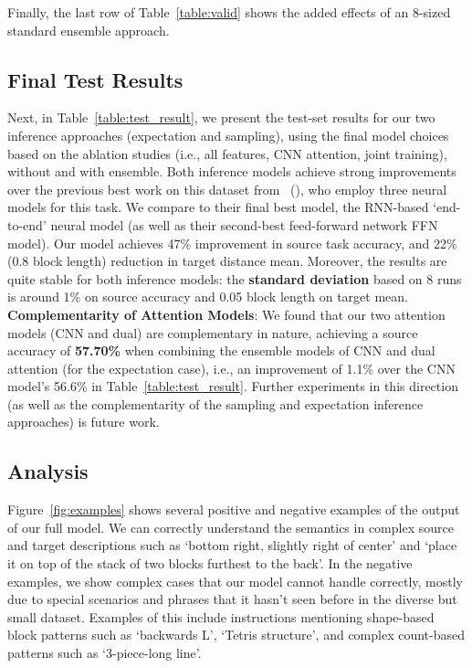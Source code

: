 \documentclass[letterpaper]{article} %
\newcommand{\newcite}[1]{\citeauthor{#1} (\citeyear{#1})}
\begin{document}
Finally, the last row of Table~\ref{table:valid} shows the added effects of an 8-sized standard ensemble approach.


\vspace{-1.65mm}
\subsection{Final Test Results}
\label{sec:finaltest}
Next, in Table~\ref{table:test_result}, we present the test-set results for our two inference approaches (expectation and sampling), using the final model choices based on the ablation studies (i.e., all features, CNN attention, joint training), without and with ensemble.
Both inference models achieve strong improvements over the previous best work on this dataset from~\newcite{bisk2016natural}, who employ three neural models for this task. We compare to their final best model, the RNN-based `end-to-end' neural model (as well as their second-best feed-forward network FFN model).
Our model achieves 47\% improvement in source task accuracy, and 22\% (0.8 block length) reduction in target distance mean.
Moreover, the results are quite stable for both inference models: the \textbf{standard deviation} based on 8 runs is around 1\% on source accuracy and 0.05 block length on target mean.  \textbf{Complementarity of Attention Models}:
We found that our two attention models (CNN and dual) are complementary in nature, achieving a source accuracy of \textbf{57.70\%} when combining the ensemble models of CNN and dual attention (for the expectation case), i.e., an improvement of 1.1\% over the CNN model's 56.6\% in Table~\ref{table:test_result}.
Further experiments in this direction (as well as the complementarity of the sampling and expectation inference approaches) is future work.



\vspace{-1.48mm}
\subsection{Analysis}
Figure~\ref{fig:examples} shows several positive and negative examples of the output of our full model. We can correctly understand the semantics in complex source and target descriptions such as `bottom right, slightly right of center' and `place it on top of the stack of two blocks furthest to the back'. In the negative examples, we show complex cases that our model cannot handle correctly, mostly due to special scenarios and phrases that it hasn't seen before in the diverse but small dataset. Examples of this include instructions mentioning shape-based block patterns such as `backwards L', `Tetris structure', and complex count-based patterns such as `3-piece-long line'.
\end{document}
